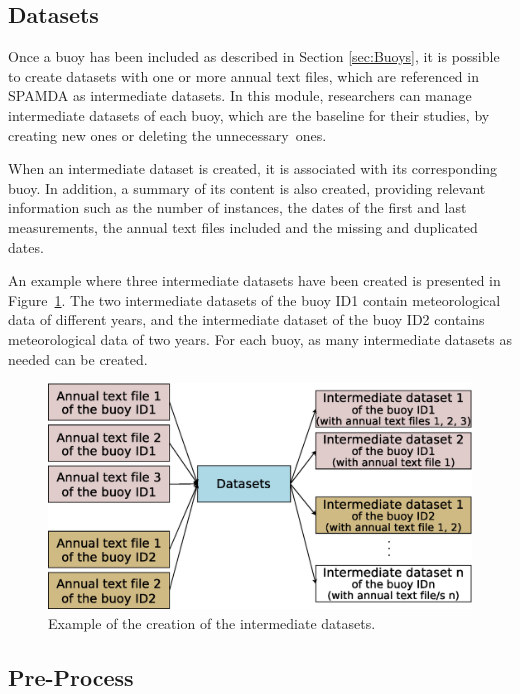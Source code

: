 \documentclass[energies,article,accept,moreauthors,pdftex]{Definitions/mdpi}
\begin{document}
\begin{paracol}{2}
			\subsection{Datasets}\label{sec:Datasets}
			
				Once a buoy has been included as described in Section \ref{sec:Buoys}, it is possible to create datasets with one or more annual text files, which are referenced in SPAMDA as intermediate datasets. In this module, researchers can manage intermediate datasets of each buoy, which are the baseline for their studies, by creating new ones or deleting the unnecessary~ones.
				
				When an intermediate dataset is created, it is associated with its corresponding buoy. In addition, a summary of its content is also created, providing relevant information such as the number of instances, the dates of the first and last measurements, the annual text files included and the missing and duplicated dates.
				
				An example where three intermediate datasets have been created is presented in \mbox{Figure \ref{fig:datasets}}. The two intermediate datasets of the buoy ID1 contain meteorological data of different years, and the intermediate dataset of the buoy ID2 contains meteorological data of two years. For each buoy, as many intermediate datasets as needed can be created.
				
				\begin{figure}[H]
					\includegraphics[scale=0.4]{figures/FigureDatasets.eps}
					\caption{Example of the creation of the intermediate datasets.}
					\label{fig:datasets}
				\end{figure}
				
				
			\subsection{Pre-Process} \label{sec:Preprocess}
				

\end{paracol}
\end{document}
